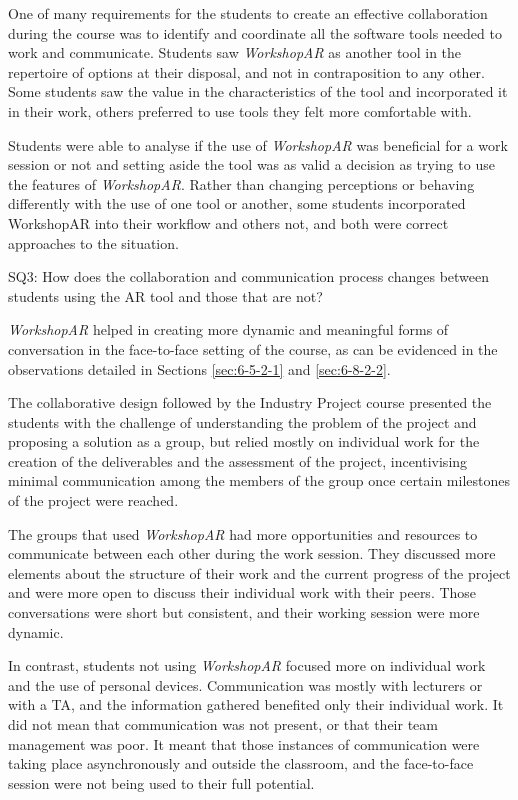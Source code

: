 One of many requirements for the students to create an effective collaboration during the course was to identify and coordinate all the software tools needed to work and
communicate. Students saw \emph{WorkshopAR} as another tool in the repertoire of options at their disposal, and not in contraposition to any other. Some students saw the
value in the characteristics of the tool and incorporated it in their work, others preferred to use tools they felt more comfortable with.

Students were able to analyse if the use of \emph{WorkshopAR} was beneficial for a work session or not and setting aside the tool was as valid a decision as trying to use
the features of \emph{WorkshopAR}. Rather than changing perceptions or behaving differently with the use of one tool or another, some students incorporated WorkshopAR into
their workflow and others not, and both were correct approaches to the situation.

\begin{displayquote}
    SQ3: How does the collaboration and communication process changes between students using the \ac{AR} tool and those that are not? 
\end{displayquote}

\emph{WorkshopAR} helped in creating more dynamic and meaningful forms of conversation in the face-to-face setting of the course, as can be evidenced in the observations
detailed in Sections \ref{sec:6-5-2-1} and \ref{sec:6-8-2-2}.

The collaborative design followed by the Industry Project course presented the students with the challenge of understanding the problem of the project and proposing a
solution as a group, but relied mostly on individual work for the creation of the deliverables and the assessment of the project, incentivising minimal communication among
the members of the group once certain milestones of the project were reached.

The groups that used \emph{WorkshopAR} had more opportunities and resources to communicate between each other during the work session. They discussed more elements about
the structure of their work and the current progress of the project and were more open to discuss their individual work with their peers. Those conversations were short
but consistent, and their working session were more dynamic.

In contrast, students not using \emph{WorkshopAR} focused more on individual work and the use of personal devices. Communication was mostly with lecturers or with a \acf{TA},
and the information gathered benefited only their individual work. It did not mean that communication was not present, or that their team management was poor. It meant that
those instances of communication were taking place asynchronously and outside the classroom, and the face-to-face session were not being used to their full potential.

